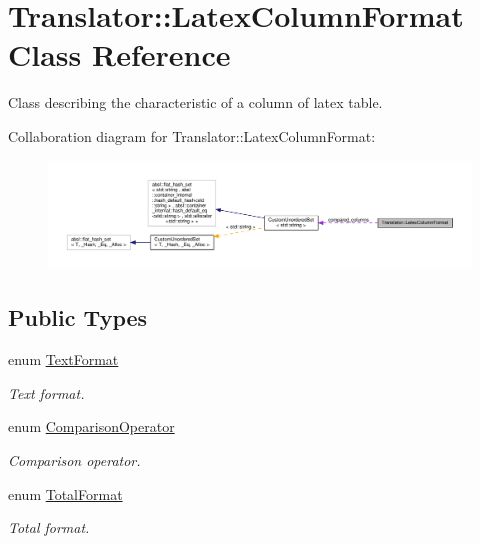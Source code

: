\hypertarget{classTranslator_1_1LatexColumnFormat}{}\section{Translator\+:\+:Latex\+Column\+Format Class Reference}
\label{classTranslator_1_1LatexColumnFormat}


Class describing the characteristic of a column of latex table.  




Collaboration diagram for Translator\+:\+:Latex\+Column\+Format\+:
\nopagebreak
\begin{figure}[H]
\begin{center}
\leavevmode
\includegraphics[width=350pt]{dd/df6/classTranslator_1_1LatexColumnFormat__coll__graph}
\end{center}
\end{figure}
\subsection*{Public Types}
\begin{DoxyCompactItemize}
\item 
enum \hyperlink{classTranslator_1_1LatexColumnFormat_a3e57341308ef433ca03cb41faa3e6c00}{Text\+Format} \begin{DoxyCompactList}\small\item\em Text format. \end{DoxyCompactList}
\item 
enum \hyperlink{classTranslator_1_1LatexColumnFormat_a9401c4c02f92f224268e919aac9cb15e}{Comparison\+Operator} \begin{DoxyCompactList}\small\item\em Comparison operator. \end{DoxyCompactList}
\item 
enum \hyperlink{classTranslator_1_1LatexColumnFormat_a0754fb96fce28c9f04a8ef5353eede60}{Total\+Format} \begin{DoxyCompactList}\small\item\em Total format. \end{DoxyCompactList}
\end{DoxyCompactItemize}

